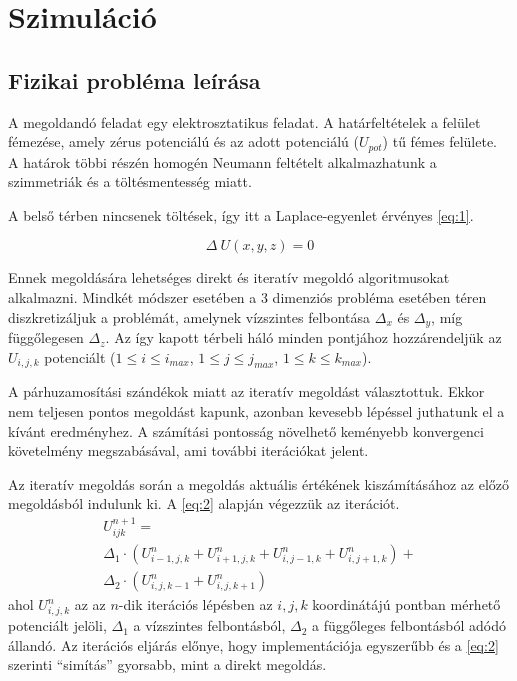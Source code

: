 	
	
	\section{Szimuláció} 
	
	\subsection{Fizikai probléma leírása} 
	
	A megoldandó feladat egy elektrosztatikus feladat.
	A  határfeltételek a felület fémezése, amely zérus potenciálú és az adott
	potenciálú ($U_{pot}$) tű fémes felülete.
	A határok többi részén homogén Neumann feltételt alkalmazhatunk a szimmetriák és a töltésmentesség miatt.
	
	A belső térben nincsenek töltések, így itt a Laplace-egyenlet érvényes
	\eqref{eq:1}.
	
	\begin{equation}\label{eq:1}
		\Delta \ U(x,y,z) = 0 
	\end{equation}
	
	Ennek megoldására lehetséges direkt és iteratív megoldó algoritmusokat alkalmazni.
	Mindkét módszer esetében a 3 dimenziós probléma esetében téren diszkretizáljuk a problémát,
	amelynek vízszintes felbontása $\Delta_x$ és $\Delta_y$, míg függőlegesen $\Delta_z$.
	Az így kapott térbeli háló minden pontjához hozzárendeljük az $U_{i,j,k}$ potenciált
	 ($1\leq i\leq i_{max}$, $1\leq j\leq j_{max}$, $1\leq k\leq k_{max}$). 
	
	A párhuzamosítási szándékok miatt az iteratív megoldást választottuk.
	Ekkor nem teljesen pontos megoldást kapunk, azonban kevesebb lépéssel
	juthatunk el a kívánt eredményhez.
	A számítási pontosság növelhető keményebb konvergenci követelmény
	megszabásával, ami további iterációkat jelent.
	
	Az iteratív megoldás során a megoldás aktuális értékének kiszámításához az
	előző megoldásból indulunk ki.
	A \eqref{eq:2} alapján végezzük az iterációt.
		\begin{multline} \label{eq:2} 
			U_{ijk}^{n+1} = \\ \Delta_1 \cdot \left(U_{i-1,j,k}^n+U_{i+1,j,k}^n
			+U_{i,j-1,k}^n+U_{i,j+1,k}^n\right)+ \\
							\Delta_2 \cdot \left(U_{i,j,k-1}^n+U_{i,j,k+1}^n\right)
		\end{multline}
	ahol $U_{i,j,k}^n$ az az $n$-dik iterációs lépésben az $i,j,k$ koordinátájú
	pontban mérhető potenciált jelöli, $\Delta_1$ a vízszintes felbontásból,
	$\Delta_2$ a függőleges felbontásból adódó állandó.
	Az iterációs eljárás előnye, hogy implementációja egyszerűbb és a
	\eqref{eq:2} szerinti ``simítás'' gyorsabb, mint a direkt megoldás.
	
